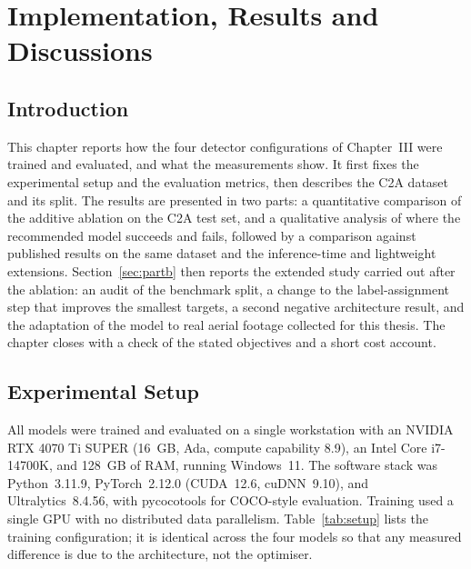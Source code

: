 \chapter{Implementation, Results and Discussions}

\section{Introduction}
This chapter reports how the four detector configurations of Chapter~III were
trained and evaluated, and what the measurements show. It first fixes the
experimental setup and the evaluation metrics, then describes the C2A dataset and
its split. The results are presented in two parts: a quantitative comparison of
the additive ablation on the C2A test set, and a qualitative analysis of where the
recommended model succeeds and fails, followed by a comparison against published
results on the same dataset and the inference-time and lightweight extensions.
Section~\ref{sec:partb} then reports the extended study carried out after the
ablation: an audit of the benchmark split, a change to the label-assignment step
that improves the smallest targets, a second negative architecture result, and the
adaptation of the model to real aerial footage collected for this thesis. The
chapter closes with a check of the stated objectives and a short cost account.

\section{Experimental Setup}
All models were trained and evaluated on a single workstation with an NVIDIA RTX
4070 Ti SUPER (16~GB, Ada, compute capability 8.9), an Intel Core i7-14700K, and
128~GB of RAM, running Windows~11. The software stack was Python~3.11.9,
PyTorch~2.12.0 (CUDA~12.6, cuDNN~9.10), and Ultralytics~8.4.56, with
pycocotools for COCO-style evaluation. Training used a single GPU with no
distributed data parallelism. Table~\ref{tab:setup} lists the training
configuration; it is identical across the four models so that any measured
difference is due to the architecture, not the optimiser.

